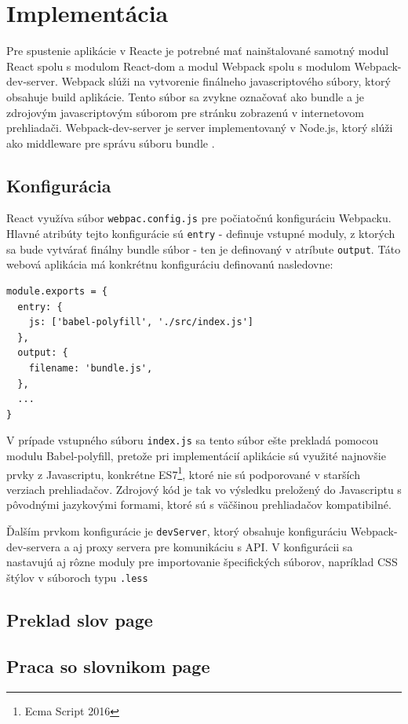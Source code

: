 \documentclass[
  digital, %
  table,   %
  lof,     %
  lot,     %
]{fithesis3}
\begin{document}
\section{Implementácia}
Pre spustenie aplikácie v Reacte je potrebné mať nainštalované samotný modul React spolu s modulom React-dom a modul Webpack spolu s modulom Webpack-dev-server. Webpack slúži na vytvorenie finálneho javascriptového súbory, ktorý obsahuje build aplikácie. Tento súbor sa zvykne označovať ako bundle a je zdrojovým javascriptovým súborom pre stránku zobrazenú v internetovom prehliadači. Webpack-dev-server je server implementovaný v Node.js, ktorý slúži ako middleware pre správu súboru bundle \parencite{webpack}.

\subsection{Konfigurácia}
React využíva súbor \texttt{webpac.config.js} pre počiatočnú konfiguráciu Webpacku. Hlavné atribúty tejto konfigurácie sú \texttt{entry} - definuje vstupné moduly, z ktorých sa bude vytvárať finálny bundle súbor - ten je definovaný v atríbute \texttt{output}. Táto webová aplikácia má konkrétnu konfiguráciu definovanú nasledovne:

\begin{lstlisting}[basicstyle=\small]
module.exports = {  
  entry: {
    js: ['babel-polyfill', './src/index.js']
  },
  output: {
    filename: 'bundle.js',
  },
  ...
}
\end{lstlisting}

V prípade vstupného súboru \texttt{index.js} sa tento súbor ešte prekladá pomocou modulu Babel-polyfill, pretože pri implementácií aplikácie sú využité najnovšie prvky z Javascriptu, konkrétne ES7\footnote{Ecma Script 2016}, ktoré nie sú podporované v starších verziach prehliadačov. Zdrojový kód je tak vo výsledku preložený do Javascriptu s pôvodnými jazykovými formami, ktoré sú s väčšinou prehliadačov kompatibilné.

Ďalším prvkom konfigurácie je \texttt{devServer}, ktorý obsahuje konfiguráciu Webpack-dev-servera a aj proxy servera pre komunikáciu s API. V konfigurácii sa nastavujú aj rôzne moduly pre importovanie špecifických súborov, napríklad CSS štýlov v súboroch typu \texttt{.less}

\subsection{Preklad slov page}
\subsection{Praca so slovnikom page}
\end{document}
